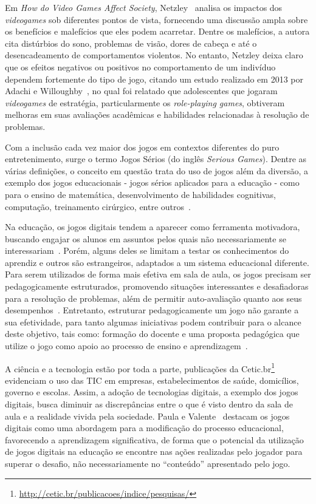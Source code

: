 Em \textit{How do Video Games Affect Society}, Netzley~\cite{netzley_how_2015} analisa os impactos dos \textit{videogames} sob diferentes pontos de vista, fornecendo uma discussão ampla sobre os benefícios e malefícios que eles podem acarretar. Dentre os malefícios, a autora cita distúrbios do sono, problemas de visão, dores de cabeça e até o desencadeamento de comportamentos violentos. No entanto, Netzley deixa claro que os efeitos negativos ou positivos no comportamento de um indivíduo dependem fortemente do tipo de jogo, citando um estudo realizado em 2013 por Adachi e Willoughby~\cite{adachi_more_2013}, no qual foi relatado que adolescentes que jogaram \textit{videogames} de estratégia, particularmente os \textit{role-playing games}, obtiveram melhoras em suas avaliações acadêmicas e habilidades relacionadas à resolução de problemas.

Com a inclusão cada vez maior dos jogos em contextos diferentes do puro entretenimento, surge o termo Jogos Sérios (do inglês \textit{Serious Games}). Dentre as várias definições, o conceito em questão trata do uso de jogos além da diversão, a exemplo dos jogos educacionais - jogos sérios aplicados para a educação - como para o ensino de matemática, desenvolvimento de habilidades cognitivas, computação, treinamento cirúrgico, entre outros~\cite{backlund_educational_2013}.

Na educação, os jogos digitais tendem a aparecer como ferramenta motivadora, buscando engajar os alunos em assuntos pelos quais não necessariamente se interessariam~\cite{paula_jogos_2016}. Porém, alguns deles se limitam a testar os conhecimentos do aprendiz e outros são estrangeiros, adaptados a um sistema educacional diferente. Para serem utilizados de forma mais efetiva em sala de aula, os jogos precisam ser pedagogicamente estruturados, promovendo situações interessantes e desafiadoras para a resolução de problemas, além de permitir auto-avaliação quanto aos seus desempenhos~\cite{moratori_por_2003}. Entretanto, estruturar pedagogicamente um jogo não garante a sua efetividade, para tanto algumas iniciativas podem contribuir para o alcance deste objetivo, tais como: formação do docente e uma proposta pedagógica que utilize o jogo como apoio ao processo de ensino e aprendizagem~\cite{araujo_construcao_2016,lopes_videojogos_2013}.

A ciência e a tecnologia estão por toda a parte, publicações da Cetic.br\footnote{\url{http://cetic.br/publicacoes/indice/pesquisas/}} evidenciam  o uso das \acrshort{TIC} em empresas, estabelecimentos de saúde, domicílios, governo e escolas.  Assim, a adoção de tecnologias digitais, a exemplo dos jogos digitais, busca diminuir as discrepâncias entre o que é visto dentro da sala de aula e a realidade vivida pela sociedade. Paula e Valente~\cite{paula_jogos_2016} destacam os jogos digitais como uma abordagem para a modificação do processo educacional, favorecendo a aprendizagem significativa, de forma que o potencial da utilização de jogos digitais na educação se encontre nas ações realizadas pelo jogador para superar o desafio, não necessariamente no “conteúdo” apresentado pelo jogo.

